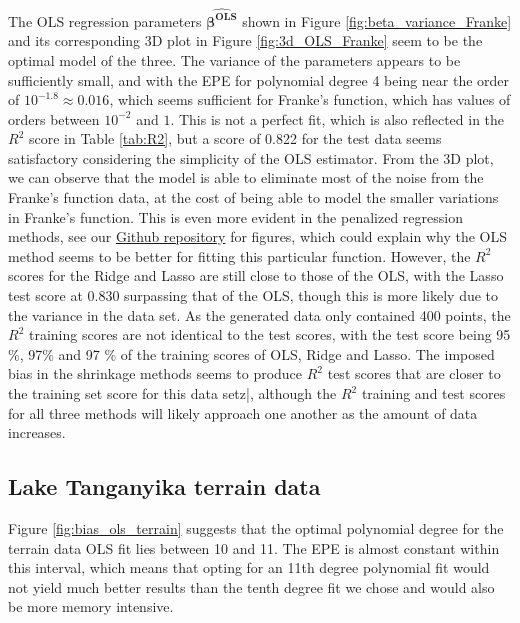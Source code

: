 \documentclass[a4paper, 10pt]{article}
\begin{document}
\begin{multicols}{2}
The OLS regression parameters $\bm{\hat{\beta ^\text{OLS}}}$ shown in Figure \ref{fig:beta_variance_Franke} and its  corresponding 3D plot in Figure \ref{fig:3d_OLS_Franke} seem to be the optimal model of the three. The variance of the parameters appears to be sufficiently small, and with the EPE for polynomial degree 4 being near the order of $10^{-1.8}\approx 0.016$, which seems sufficient for Franke's function, which has values of orders between  $10^{{-2}}$ and $1$.  This is not a perfect fit, which is also reflected in the $R^2$ score in Table \ref{tab:R2}, but a score of 0.822 for the test data seems satisfactory considering the simplicity of the OLS estimator. From the 3D plot, we can observe that the model is able to eliminate most of the noise from the Franke's function data, at the cost of being able to model the smaller variations in Franke's function. This is even more evident in the penalized regression methods, see our \href{https://github.com/bernharl/FYS-STK4155-project1}{Github repository} for figures, which could explain why the OLS method seems to be better for fitting this particular function. However, the $R^2$ scores for the Ridge and Lasso are still close to those of the OLS, with the Lasso test score at 0.830 surpassing that of the OLS, though this is more likely due to the variance in the data set. As the generated data only contained 400 points, the $R^2$ training scores are not identical to the test scores,  with the test score being 95 \%, 97\% and 97 \% of the training scores of OLS, Ridge and Lasso. The imposed bias in the shrinkage methods seems to produce $R^2$ test scores that are closer to the training set score for this data setz|,  although the $R^2$ training and test scores for all three methods will likely approach one another as the amount of data increases.



\subsection{Lake Tanganyika terrain data}
Figure \ref{fig:bias_ols_terrain} suggests that the optimal polynomial degree for the terrain data OLS fit lies between 10 and 11.  The EPE is almost constant within this interval, which means that opting for an 11th degree polynomial fit would not yield much better results than the tenth degree fit we chose and would also be more memory intensive. 


\end{multicols}
\end{document}
